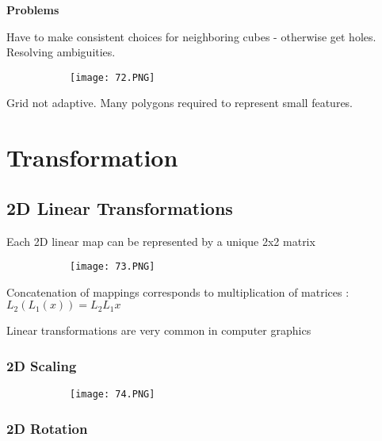\documentclass{article}
\begin{document}
\textbf{Problems}

Have to make consistent choices for neighboring cubes - otherwise get holes.
Resolving ambiguities.

     \begin{figure}[ht!]
  \centering
  \begin{subfigure}[b]{0.4\linewidth}
    \texttt{[image: 72.PNG]}
  \end{subfigure}
\end{figure} 
    
Grid not adaptive. 
Many polygons required to represent small features.




\section{Transformation}

\subsection{2D Linear Transformations}

Each 2D linear map can be represented by a unique 2x2 matrix 

     \begin{figure}[ht!]
  \centering
  \begin{subfigure}[b]{0.6\linewidth}
    \texttt{[image: 73.PNG]}
  \end{subfigure}
\end{figure} 

Concatenation of mappings corresponds to multiplication of matrices : $L_2(L_1(x)) = L_2 L_1 x$

Linear transformations are very common in computer graphics
\subsubsection{2D Scaling}


\begin{figure}[ht!]
  \centering
  \begin{subfigure}[b]{0.6\linewidth}
    \texttt{[image: 74.PNG]}
  \end{subfigure}
\end{figure} 

\subsubsection{2D Rotation}
\end{document}
